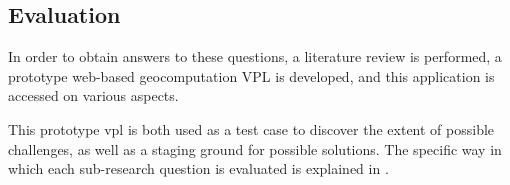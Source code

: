 \subsection*{Evaluation}
In order to obtain answers to these questions, a literature review is performed,
a prototype web-based geocomputation VPL is developed, 
and this application is accessed on various aspects.

This prototype vpl is both used as a test case to discover the extent of possible challenges, as well as a staging ground for possible solutions. 
The specific way in which each sub-research question is evaluated is explained in .





